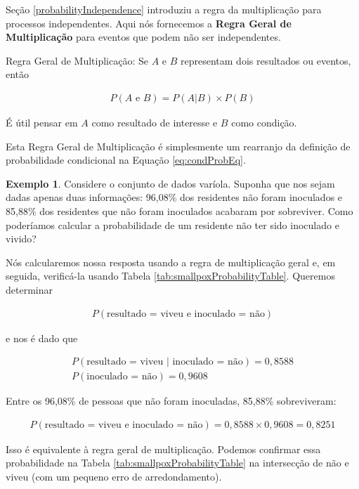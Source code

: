 \documentclass[
]{book}
\theoremstyle{definition}
\theoremstyle{definition}
\newtheorem{example}{Exemplo}[chapter]
\theoremstyle{definition}
\theoremstyle{definition}
\theoremstyle{remark}
\begin{document}
Seção \ref{probabilityIndependence} introduziu a regra da multiplicação para processos independentes. Aqui nós fornecemos a \textbf{Regra Geral de Multiplicação} para eventos que podem não ser independentes.

Regra Geral de Multiplicação: Se \(A\) e \(B\) representam dois resultados ou eventos, então

\begin{eqnarray*}
P(A\text{ e }B) = P(A | B)\times P(B)
\end{eqnarray*}

É útil pensar em \(A\) como resultado de interesse e \(B\) como condição.

Esta Regra Geral de Multiplicação é simplesmente um rearranjo da definição de probabilidade condicional na Equação \eqref{eq:condProbEq}.

\begin{example}
\protect\hypertarget{exm:unnamed-chunk-61}{}{\label{exm:unnamed-chunk-61} }Considere o conjunto de dados varíola. Suponha que nos sejam dadas apenas duas informações: 96,08\% dos residentes não foram inoculados e 85,88\% dos residentes que não foram inoculados acabaram por sobreviver. Como poderíamos calcular a probabilidade de um residente não ter sido inoculado e vivido?

Nós calcularemos nossa resposta usando a regra de multiplicação geral e, em seguida, verificá-la usando Tabela \ref{tab:smallpoxProbabilityTable}. Queremos determinar

\begin{eqnarray*}
P(\text{resultado = viveu e inoculado = não})
\end{eqnarray*}

e nos é dado que

\begin{eqnarray*}
P(\text{resultado = viveu | inoculado = não})=0,8588 \\
P(\text{inoculado = não})=0,9608
\end{eqnarray*}

Entre os 96,08\% de pessoas que não foram inoculadas, 85,88\% sobreviveram:

\begin{eqnarray*}
P(\text{resultado = viveu e inoculado = não}) = 0,8588 \times 0,9608 = 0,8251
\end{eqnarray*}

Isso é equivalente à regra geral de multiplicação. Podemos confirmar essa probabilidade na Tabela \ref{tab:smallpoxProbabilityTable} na intersecção de não e viveu (com um pequeno erro de arredondamento).
\end{example}
\end{document}
